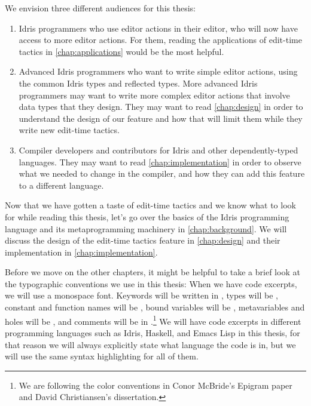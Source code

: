 We envision three different audiences for this thesis:
\begin{enumerate}[(1)]
\item Idris programmers who use editor actions in their editor, who will now
  have access to more editor actions. For them, reading the applications of
edit-time tactics in \autoref{chap:applications} would be the most helpful.
\item Advanced Idris programmers who want to write simple editor actions, using
  the common Idris types and reflected types. More advanced Idris programmers
    may want to write more complex editor actions that involve data types
    that they design.
    They may want to read \autoref{chap:design} in order to understand the
    design of our feature and how that will limit them while they write new
    edit-time tactics.
\item Compiler developers and contributors for Idris and other
  dependently-typed languages.  They may want to read
    \autoref{chap:implementation} in order to observe what we needed to change
    in the compiler, and how they can add this feature to a different language.
\end{enumerate}

Now that we have gotten a taste of edit-time tactics and we know what to look
for while reading this thesis, let's go over the basics of the Idris
programming language and its metaprogramming machinery in
\autoref{chap:background}.
We will discuss the design of the edit-time tactics feature in
\autoref{chap:design} and their implementation in
\autoref{chap:implementation}.

Before we move on the other chapters, it might be helpful to take a brief look
at the typographic conventions we use in this thesis: When we have code
excerpts, we will use a monospace font.  Keywords will be written in , types will be , constant and function names will be
, bound variables will be , metavariables and holes
will be \texttt{}, and comments will be in
.\footnote{We are following the color conventions in Conor McBride's
Epigram paper\cite{epigram} and David Christiansen's
dissertation\cite{davidphd}.} We will have code excerpts in different
programming languages such as Idris, Haskell, and Emacs Lisp in this thesis,
for that reason we will always explicitly state what language the code is in,
but we will use the same syntax highlighting for all of them.
